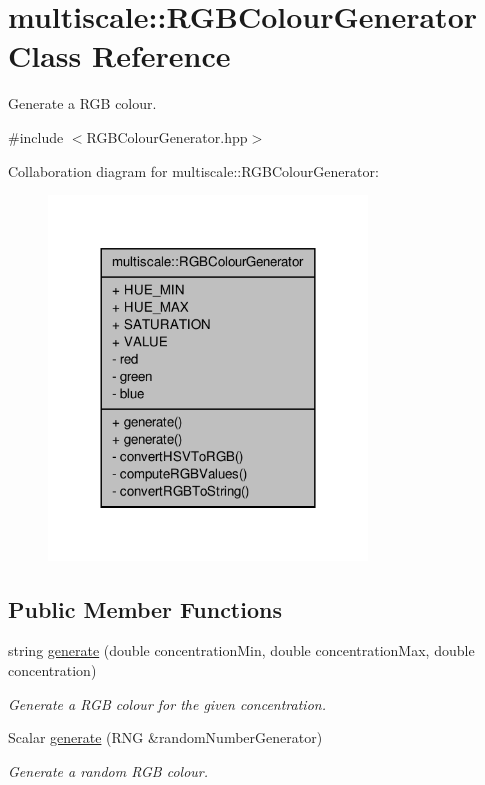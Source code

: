 \hypertarget{classmultiscale_1_1RGBColourGenerator}{\section{multiscale\-:\-:R\-G\-B\-Colour\-Generator Class Reference}
\label{classmultiscale_1_1RGBColourGenerator}
}


Generate a R\-G\-B colour.  




{\ttfamily \#include $<$R\-G\-B\-Colour\-Generator.\-hpp$>$}



Collaboration diagram for multiscale\-:\-:R\-G\-B\-Colour\-Generator\-:\nopagebreak
\begin{figure}[H]
\begin{center}
\leavevmode
\includegraphics[width=240pt]{classmultiscale_1_1RGBColourGenerator__coll__graph}
\end{center}
\end{figure}
\subsection*{Public Member Functions}
\begin{DoxyCompactItemize}
\item 
string \hyperlink{classmultiscale_1_1RGBColourGenerator_ab96622fb17f93d1f92a3b8b9fd978725}{generate} (double concentration\-Min, double concentration\-Max, double concentration)
\begin{DoxyCompactList}\small\item\em Generate a R\-G\-B colour for the given concentration. \end{DoxyCompactList}\item 
Scalar \hyperlink{classmultiscale_1_1RGBColourGenerator_a9eadd001d970bdb3c4237ab3a1b6683a}{generate} (R\-N\-G \&random\-Number\-Generator)
\begin{DoxyCompactList}\small\item\em Generate a random R\-G\-B colour. \end{DoxyCompactList}\end{DoxyCompactItemize}
